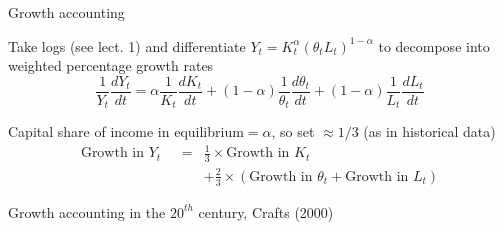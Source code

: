 
\begin{frame}{Growth accounting}

Take logs (see lect. 1) and differentiate $Y_{t}=K_{t}^{\alpha }\left( \theta_{t}L_{t}\right) ^{1-\alpha }$ to decompose into weighted percentage growth rates
\begin{equation*}
\frac{1}{Y_{t}}\frac{dY_{t}}{dt}=\alpha \frac{1}{K_{t}}\frac{dK_{t}}{dt}+(1-\alpha )\frac{1}{\theta_{t}}\frac{d\theta_{t}}{dt}+(1-\alpha )\frac{1}{L_{t}}\frac{dL_{t}}{dt}
\end{equation*}

\vspace{5mm}
Capital share of income in equilibrium$=\alpha$, so set $\approx 1/3$ (as in historical data)
\begin{eqnarray*}
\text{Growth in }Y_{t}\text{ } &=&\frac{1}{3}\times \text{Growth in }K_{t} \\
&&+\frac{2}{3}\times \left( \text{Growth in }\theta _{t}+\text{Growth in }L_{t}\right)
\end{eqnarray*}

\end{frame}


\begin{frame}{Growth accounting in the $20^{th}$ century, Crafts (2000)}

\begin{figure}
\centering
{}\\
\\
\end{figure}

\end{frame}

